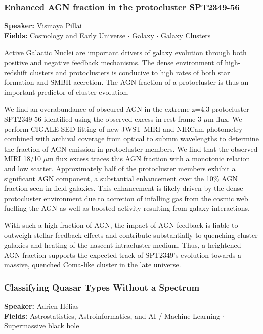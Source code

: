 \hypertarget{abstract-talk-327}{}\label{abstract-page-talk-327}
\subsubsection*{Enhanced AGN fraction in the protocluster SPT2349-56}
\textbf{Speaker:} Vismaya Pillai\\
\textbf{Fields:} Cosmology and Early Universe $\cdot$ Galaxy $\cdot$ Galaxy Clusters

Active Galactic Nuclei are important drivers of galaxy evolution through both positive and negative feedback mechanisms. The dense environment of high-redshift clusters and protoclusters is conducive to high rates of both star formation and SMBH accretion. The AGN fraction of a protocluster is thus an important predictor of cluster evolution.

We find an overabundance of obscured AGN in the extreme z=4.3 protocluster SPT2349-56 identified using the observed excess in rest-frame 3 $\mu$m flux. We perform CIGALE SED-fitting of new JWST MIRI and NIRCam photometry combined with archival coverage from optical to submm wavelengths to determine the fraction of AGN emission in protocluster members. We find that the observed MIRI 18/10 $\mu$m flux excess traces this AGN fraction with a monotonic relation and low scatter. Approximately half of the protocluster members exhibit a significant AGN component, a substantial enhancement over the 10\% AGN fraction seen in field galaxies. This enhancement is likely driven by the dense protocluster environment due to accretion of infalling gas from the cosmic web fuelling the AGN as well as boosted activity resulting from galaxy interactions.

With such a high fraction of AGN, the impact of AGN feedback is liable to outweigh stellar feedback effects and contribute substantially to quenching cluster galaxies and heating of the nascent intracluster medium. Thus, a heightened AGN fraction supports the expected track of SPT2349's evolution towards a massive, quenched Coma-like cluster in the late universe.

\hypertarget{abstract-talk-193}{}\label{abstract-page-talk-193}
\subsubsection*{Classifying Quasar Types Without a Spectrum}
\textbf{Speaker:} Adrien Hélias\\
\textbf{Fields:} Astrostatistics, Astroinformatics, and AI / Machine Learning $\cdot$ Supermassive black hole


